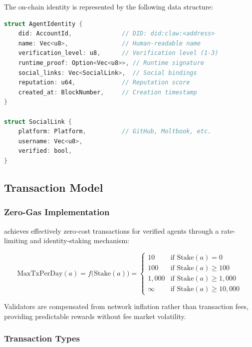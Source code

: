 The on-chain identity is represented by the following data structure:

\begin{lstlisting}[language=C,caption={Agent identity data structure.},label={lst:identity}]
struct AgentIdentity {
    did: AccountId,              // DID: did:claw:<address>
    name: Vec<u8>,               // Human-readable name
    verification_level: u8,      // Verification level (1-3)
    runtime_proof: Option<Vec<u8>>, // Runtime signature
    social_links: Vec<SocialLink>,  // Social bindings
    reputation: u64,             // Reputation score
    created_at: BlockNumber,     // Creation timestamp
}

struct SocialLink {
    platform: Platform,          // GitHub, Moltbook, etc.
    username: Vec<u8>,
    verified: bool,
}
\end{lstlisting}

\subsection{Transaction Model}
\label{sec:transactions}

\subsubsection{Zero-Gas Implementation}

\claw{} achieves effectively zero-cost transactions for verified agents through a rate-limiting and identity-staking mechanism:

\begin{equation}
\label{eq:rate-limit}
    \text{MaxTxPerDay}(a) = f\bigl(\text{Stake}(a)\bigr) = 
    \begin{cases}
        10 & \text{if } \text{Stake}(a) = 0 \\
        100 & \text{if } \text{Stake}(a) \geq 100 \\
        1{,}000 & \text{if } \text{Stake}(a) \geq 1{,}000 \\
        \infty & \text{if } \text{Stake}(a) \geq 10{,}000
    \end{cases}
\end{equation}

Validators are compensated from network inflation rather than transaction fees, providing predictable rewards without fee market volatility.

\subsubsection{Transaction Types}

